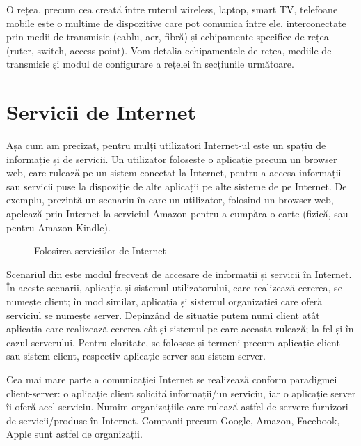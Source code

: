 O rețea, precum cea creată între ruterul wireless, laptop, smart TV, telefoane mobile este o mulțime de dispozitive care pot comunica între ele, interconectate prin medii de transmisie (cablu, aer, fibră) și echipamente specifice de rețea (ruter, switch, access point). Vom detalia echipamentele de rețea, mediile de transmisie și modul de configurare a rețelei în secțiunile următoare.

\section{Servicii de Internet}
\label{sec:net:internet-services}

Așa cum am precizat, pentru mulți utilizatori Internet-ul este un spațiu de informație și de servicii. Un utilizator folosește o aplicație precum un browser web, care rulează pe un sistem conectat la Internet, pentru a accesa informații sau servicii puse la dispoziție de alte aplicații pe alte sisteme de pe Internet. De exemplu,  prezintă un scenariu în care un utilizator, folosind un browser web, apelează prin Internet la serviciul Amazon pentru a cumpăra o carte (fizică, sau pentru Amazon Kindle).

\begin{figure}[htbp]
  \centering
  \def\svgwidth{\columnwidth}
  
  \caption{Folosirea serviciilor de Internet}
  \label{fig:net:internet-services}
\end{figure}

Scenariul din  este modul frecvent de accesare de informații și servicii în Internet. În aceste scenarii, aplicația și sistemul utilizatorului, care realizează cererea, se numește client; în mod similar, aplicația și sistemul organizației care oferă serviciul se numește server. Depinzând de situație putem numi client atât aplicația care realizează cererea cât și sistemul pe care aceasta rulează; la fel și în cazul serverului. Pentru claritate, se folosesc și termeni precum aplicație client sau sistem client, respectiv aplicație server sau sistem server.

Cea mai mare parte a comunicației Internet se realizează conform paradigmei client-server: o aplicație client solicită informații/un serviciu, iar o aplicație server îi oferă acel serviciu. Numim organizațiile care rulează astfel de servere furnizori de servicii/produse în Internet. Companii precum Google, Amazon, Facebook, Apple sunt astfel de organizații.

